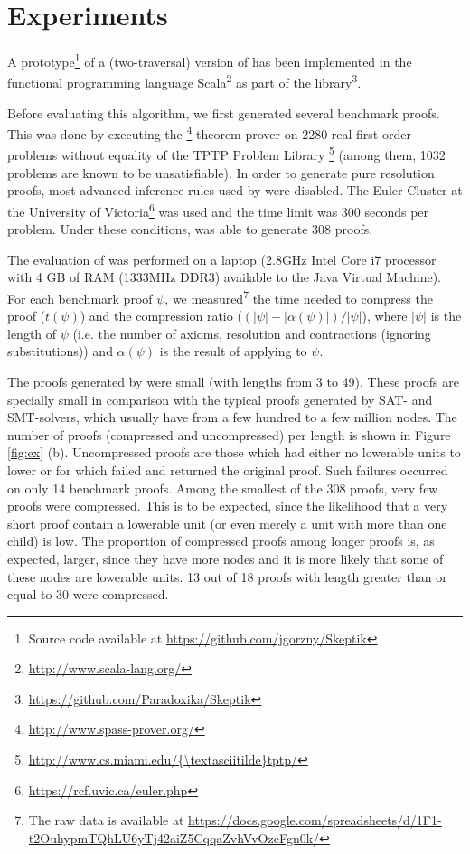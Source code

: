 \section{Experiments} \label{sec:exp}
A prototype\footnote{Source code available at \url{https://github.com/jgorzny/Skeptik}} of a (two-traversal) version of {\SFOLowerUnits} has been implemented in the functional programming language Scala\footnote{\url{http://www.scala-lang.org/}} as part of the \skeptik
 library\footnote{\url{https://github.com/Paradoxika/Skeptik}}. 

Before evaluating this algorithm, we first generated several benchmark proofs. This was done by executing the {\SPASS}\footnote{\url{http://www.spass-prover.org/}} theorem prover on 2280 real first-order problems without equality of the TPTP Problem Library \footnote{\url{http://www.cs.miami.edu/{\textasciitilde}tptp/}} (among them, 1032 problems are known to be unsatisfiable). In order to generate pure resolution proofs, most advanced inference rules used by {\SPASS}  were disabled. The Euler Cluster at the University of Victoria\footnote{\url{https://rcf.uvic.ca/euler.php}} was used and the time limit was 300 seconds per problem. Under these conditions, {\SPASS} was able to generate 308 proofs. 

The evaluation of {\SFOLowerUnits} was performed on a laptop (2.8GHz Intel Core i7 processor with 4 GB of RAM (1333MHz DDR3) available to the Java Virtual Machine). For each benchmark proof $\psi$, we measured\footnote{The raw data is available at  \url{https://docs.google.com/spreadsheets/d/1F1-t2OuhypmTQhLU6yTj42aiZ5CqqaZvhVvOzeFgn0k/}} the time needed to compress the proof ($t(\psi)$) and the compression ratio ($(|\psi|-|\alpha(\psi)|)/|\psi|$), where $|\psi|$ is the length of $\psi$ (i.e. the number of axioms, resolution and contractions (ignoring substitutions)) and $\alpha(\psi)$ is the result of applying {\SFOLowerUnits} to $\psi$.

The proofs generated by {\SPASS} were small (with lengths from 3 to 49). These proofs are specially small in comparison with the typical proofs generated by SAT- and SMT-solvers, which usually have from a few hundred to a few million nodes. The number of proofs (compressed and uncompressed) per length is shown in Figure \ref{fig:ex} (b). Uncompressed proofs are those which had either no lowerable units to lower or for which \SFOLowerUnits failed and returned the original proof. Such failures occurred on only 14 benchmark proofs. Among the smallest of the 308 proofs, very few proofs were compressed. This is to be expected, since the likelihood that a very short proof contain a lowerable unit (or even merely a unit with more than one child) is low. The proportion of compressed proofs among longer proofs is, as expected, larger, since they have more nodes and it is more likely that some of these nodes are lowerable units. 13 out of 18 proofs with length greater than or equal to 30 were compressed. 

